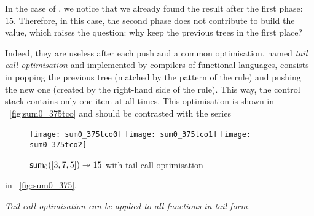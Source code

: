 In the case of , we notice that we already found the
result after the first phase:~\(15\). Therefore, in this case, the
second phase does not contribute to build the value, which raises the
question: why keep the previous trees in the first place?

Indeed, they are useless after each push and a common optimisation,
named \emph{tail call optimisation} and implemented by compilers of
functional languages, consists in popping the previous tree (matched
by the pattern of the rule) and pushing the new one (created by the
right\hyp{}hand side of the rule). This way, the control stack
contains only one item at all times. This optimisation is shown in
\fig~\vref{fig:sum0_375tco} and should be contrasted with the series
\begin{figure}[!t]
\centering
\texttt{[image: sum0\_375tco0]}
\texttt{[image: sum0\_375tco1]}
\texttt{[image: sum0\_375tco2]}
\caption{\(\textsf{sum}_0([3,7,5]) \twoheadrightarrow 15\) with tail call
  optimisation}
\label{fig:sum0_375tco}
\end{figure}
in \fig~\vref{fig:sum0_375}.

\emph{Tail call optimisation can be applied to all functions in tail
  form.}

